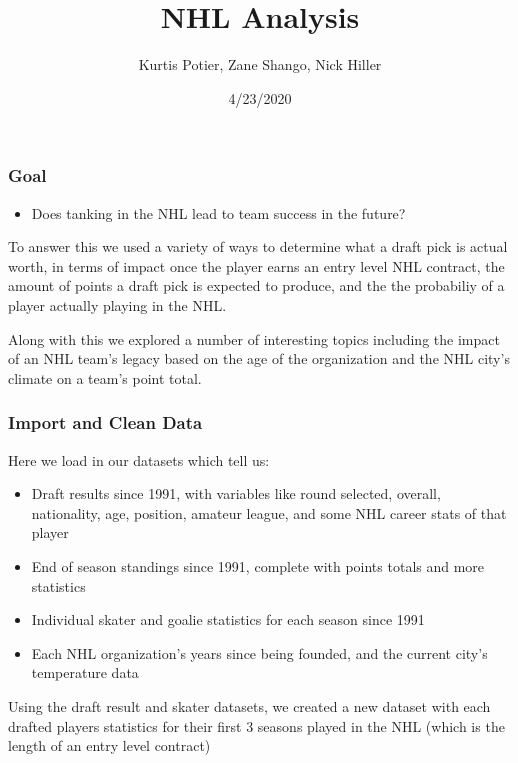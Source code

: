 \documentclass[]{article}
\title{NHL Analysis}
\author{Kurtis Potier, Zane Shango, Nick Hiller}
\date{4/23/2020}
\providecommand{\tightlist}{%
  \setlength{\itemsep}{0pt}\setlength{\parskip}{0pt}}
\begin{document}
\maketitle

\hypertarget{goal}{%
\subsubsection{Goal}\label{goal}}

\begin{itemize}
\tightlist
\item
  Does tanking in the NHL lead to team success in the future?
\end{itemize}

To answer this we used a variety of ways to determine what a draft pick
is actual worth, in terms of impact once the player earns an entry level
NHL contract, the amount of points a draft pick is expected to produce,
and the the probabiliy of a player actually playing in the NHL.

Along with this we explored a number of interesting topics including the
impact of an NHL team's legacy based on the age of the organization and
the NHL city's climate on a team's point total.

\hypertarget{import-and-clean-data}{%
\subsubsection{Import and Clean Data}\label{import-and-clean-data}}

Here we load in our datasets which tell us:

\begin{itemize}
\item
  Draft results since 1991, with variables like round selected, overall,
  nationality, age, position, amateur league, and some NHL career stats
  of that player
\item
  End of season standings since 1991, complete with points totals and
  more statistics
\item
  Individual skater and goalie statistics for each season since 1991
\item
  Each NHL organization's years since being founded, and the current
  city's temperature data
\end{itemize}

Using the draft result and skater datasets, we created a new dataset
with each drafted players statistics for their first 3 seasons played in
the NHL (which is the length of an entry level contract)
\end{document}
